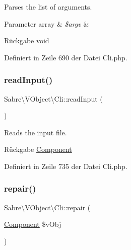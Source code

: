 Parses the list of arguments.


\begin{DoxyParams}[1]{Parameter}
array & {\em \$argv} & \\
\hline
\end{DoxyParams}
\begin{DoxyReturn}{Rückgabe}
void 
\end{DoxyReturn}


Definiert in Zeile 690 der Datei Cli.\+php.

\mbox{\label{class_sabre_1_1_v_object_1_1_cli_af6efe7e3dd222f17e1084e22eef46a2b}} 
\subsubsection{\texorpdfstring{read\+Input()}{readInput()}}
{\footnotesize\ttfamily Sabre\textbackslash{}\+V\+Object\textbackslash{}\+Cli\+::read\+Input (\begin{DoxyParamCaption}{ }\end{DoxyParamCaption})\hspace{0.3cm}{\ttfamily [protected]}}

Reads the input file.

\begin{DoxyReturn}{Rückgabe}
\mbox{\hyperlink{class_sabre_1_1_v_object_1_1_component}{Component}} 
\end{DoxyReturn}


Definiert in Zeile 735 der Datei Cli.\+php.

\mbox{\label{class_sabre_1_1_v_object_1_1_cli_a4f22de98cf2040fbb69ee9f36055e099}} 
\subsubsection{\texorpdfstring{repair()}{repair()}}
{\footnotesize\ttfamily Sabre\textbackslash{}\+V\+Object\textbackslash{}\+Cli\+::repair (\begin{DoxyParamCaption}\item[{\mbox{\hyperlink{class_sabre_1_1_v_object_1_1_component}{Component}}}]{\$v\+Obj }\end{DoxyParamCaption})\hspace{0.3cm}{\ttfamily [protected]}}

